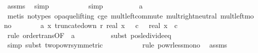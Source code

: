 \begin{isabellebody}
\ assms{\isacharparenleft}{\kern0pt}{}{\isacharparenright}{\kern0pt}\ \isamarkupfalse%
\ simp\isanewline
\ \ \ \ \ \ \ \ \ \isamarkupfalse%
\ simp\isanewline
\ \ \ \ \ \ \ \ \isamarkupfalse%
\ a{\isacharunderscore}{\kern0pt}{}{\isacharunderscore}{\kern0pt}{}\ \isanewline
\ \ \ \ \ \ \ \ \isamarkupfalse%
\ {\isacharparenleft}{\kern0pt}metis\ {\isacharparenleft}{\kern0pt}no{\isacharunderscore}{\kern0pt}types{\isacharcomma}{\kern0pt}\ opaque{\isacharunderscore}{\kern0pt}lifting{\isacharparenright}{\kern0pt}\ c{\isacharunderscore}{\kern0pt}ge{\isacharunderscore}{\kern0pt}{}\ mult{\isachardot}{\kern0pt}left{\isacharunderscore}{\kern0pt}commute\ mult{\isachardot}{\kern0pt}right{\isacharunderscore}{\kern0pt}neutral\ mult{\isacharunderscore}{\kern0pt}left{\isacharunderscore}{\kern0pt}mono{\isacharparenright}{\kern0pt}\isanewline
\isanewline
\ \ \ \ \ \ \isamarkupfalse%
\ a{\isacharunderscore}{\kern0pt}{}{\isacharcolon}{\kern0pt}\ {\isachardoublequoteopen}{\isasymAnd}x{\isachardot}{\kern0pt}\ truncate{\isacharunderscore}{\kern0pt}down\ r\ {\isacharparenleft}{\kern0pt}real\ x{\isacharparenright}{\kern0pt}\ {\isasymle}\ \ c\ \ {\isasymLongrightarrow}\ real\ x\ {\isasymle}\ c\ {\isacharasterisk}{\kern0pt}\ {}{\isachardoublequoteclose}\isanewline
\ \ \ \ \ \ \ \ \isamarkupfalse%
\ {\isacharparenleft}{\kern0pt}rule\ order{\isacharunderscore}{\kern0pt}trans{\isacharbrackleft}{\kern0pt}OF\ {\isacharunderscore}{\kern0pt}\ a{\isacharunderscore}{\kern0pt}{}{\isacharbrackright}{\kern0pt}{\isacharparenright}{\kern0pt}\isanewline
\ \ \ \ \ \ \ \ \isamarkupfalse%
\ {\isacharparenleft}{\kern0pt}subst\ pos{\isacharunderscore}{\kern0pt}le{\isacharunderscore}{\kern0pt}divide{\isacharunderscore}{\kern0pt}eq{\isacharparenright}{\kern0pt}\isanewline
\ \ \ \ \ \ \ \ \ \isamarkupfalse%
\ {\isacharparenleft}{\kern0pt}simp{\isacharcomma}{\kern0pt}\ subst\ two{\isacharunderscore}{\kern0pt}powr{\isacharunderscore}{\kern0pt}{}{\isacharbrackleft}{\kern0pt}symmetric{\isacharbrackright}{\kern0pt}{\isacharparenright}{\kern0pt}\isanewline
\ \ \ \ \ \ \ \ \ \isamarkupfalse%
\ {\isacharparenleft}{\kern0pt}rule\ powr{\isacharunderscore}{\kern0pt}less{\isacharunderscore}{\kern0pt}mono{\isacharparenright}{\kern0pt}\ \isamarkupfalse%
\ assms{\isacharparenleft}{\kern0pt}{}{\isacharparenright}{\kern0pt}\ \isamarkupfalse%

\end{isabellebody}
